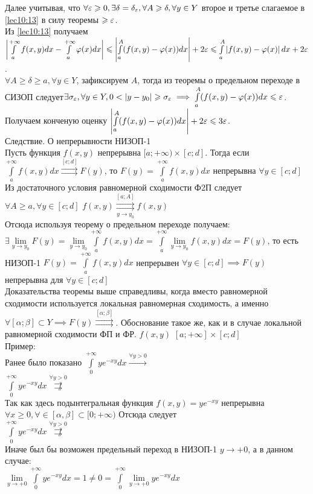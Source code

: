 \documentclass[../../main.tex]{subfiles}
\begin{document}
Далее учитывая, что $\forall \varepsilon \geqslant 0, \exists \delta = \delta_\varepsilon, \forall 
A \geqslant \delta, \forall y \in Y  $ второе и третье слагаемое в \eqref{lec10:13}
в силу теоремы $ \geqslant \varepsilon$.
\\
Из \eqref{lec10:13} получаем $ \left| \int\limits_{a}^{+\infty}f(x,y)dx - 
\int\limits_{a}^{+\infty}\varphi(x)dx\right| \leqslant \left| 
\int\limits_{a}^{A}(f(x,y) - \varphi(x))dx \right| + 2\varepsilon \leqslant 
\int\limits_{a}^{A}\left| f(x,y) - \varphi(x)\right|dx + 2\varepsilon  $.
\\
$ \forall A \ge \delta \ge a, \forall y \in Y$, зафиксируем $A$, тогда из 
теоремы о предельном переходе в СИЗОП следует$ \exists \sigma_\varepsilon, \forall y 
\in Y, 0 < \left|y - y_0 \right| \geqslant \sigma_\varepsilon \implies 
\int\limits_{a}^{A}(f(x,y) - \varphi(x))dx \leqslant \varepsilon   $.
\\
Получаем конченую оценку $\left| \int\limits_{a}^{A}(f(x,y) - \varphi(x))dx 
\right| + 2\varepsilon \leqslant 3\varepsilon$.
\\
Следствие. О непрерывности НИЗОП-1
\\
Пусть функция $f(x,y)$ непрерывна $[a;+\infty) \times [ c; d]$. Тогда если 
$\int\limits_a^{+\infty}f(x,y)dx \overset{[c;d]}\rightrightarrows F(y)$, то
$ F(y) = \int\limits_a^{+\infty}f(x,y)dx$ непрерывна $\forall y \in [c;d]$
Из достаточного условия равномерной сходимости Ф2П следует $\forall A \ge a, 
\forall y \in [c;d] $ $f(x,y) \overset{[a;A]}{\underset{y \to 
y_0}{\rightrightarrows}} f(x,y) $
\\
Отсюда используя теорему о предельном переходе получаем:$\exists \underset{y 
\to y_0}{\lim} F(y) = \underset{y \to y_0}\lim \int\limits_a^{+\infty}f(x,y)dx 
= \int\limits_a^{+\infty}\underset{y \to y_0}\lim f(x,y)dx = F(y) $, то есть 
НИЗОП-1 $F(y) = \int\limits_a^{+\infty}f(x,y)dx $ непрерывен $ \forall y \in 
[c;d] \implies F(y) $непрерывна для $ \forall y \in [c;d]$
\\
Доказательства теоремы выше справедливы, когда вместо равномерной сходимости 
используется локальная равномерная сходимость, а именно$\forall [\alpha;\beta] 
\subset Y \implies F(y) \overset{[\alpha;\beta]}{\rightrightarrows}$. 
Обоснование такое же, как и в случае локальной равномерной сходимости ФП и ФР.
$f(x,y)$ $[a;+\infty]\times[c;d]$
\\
Пример:
\\
Ранее было показано
$\int\limits_0^{+\infty}ye^{-xy}dx \xrightarrow{\forall y > 0}$
\\
$\int\limits_0^{+\infty}ye^{-xy}dx \overset{\forall y > 
0}{\not\rightrightarrows}$
\\
Так как здесь подынтегральная функция $f(x,y) = ye^{-xy}$ непрерывна $\forall 
x \ge 0, \forall \in [\alpha,\beta] \subset [0;+\infty)$ 
Отсюда следует
\\
$\int\limits_0^{+\infty}ye^{-xy}dx \overset{\forall y > 
0}{\not\rightrightarrows}$
\\
Иначе был бы возможен предельный переход в НИЗОП-1 $y \to +0 $, а в данном 
случае:
\\
$\underset{y \to +0}\lim\int\limits_0^{+\infty}ye^{-xy}dx = 1 \ne 0 = 
\int\limits_0^{+\infty}\underset{y \to +0}\lim ye^{-xy}dx$
\\
\\
\end{document}

